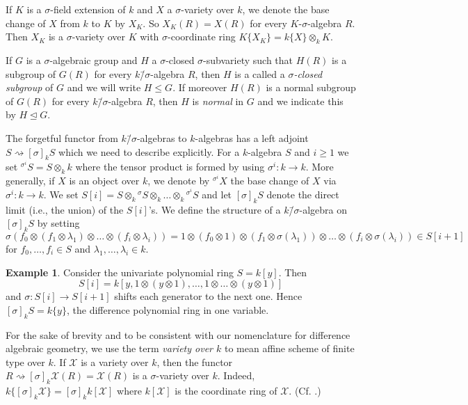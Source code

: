 \documentclass[oneside,reqno]{amsart}
\theoremstyle{definition}
\newtheorem{ex}[theo]{Example}
\newcommand{\X}{\mathcal{X}}
\newcommand{\s}{\sigma}
\newcommand{\hs}{{{}^\sigma\!}}
\newcommand{\ks}{$k$\=/$\s$}
\newcommand{\hsi}{^{\sigma^i}\!}
\begin{document}
If $K$ is a $\s$-field extension of $k$ and $X$ a $\s$-variety over $k$, we denote the base change of $X$ from $k$ to $K$ by $X_K$. So $X_K(R)=X(R)$ for every $K$-$\s$-algebra $R$. Then $X_K$ is a $\s$-variety over $K$ with $\s$-coordinate ring $K\{X_K\}=k\{X\}\otimes_k K$. 

If $G$ is a $\s$-algebraic group and $H$ a $\s$-closed $\s$-subvariety such that $H(R)$ is a subgroup of $G(R)$ for every \ks-algebra $R$, then $H$ is a called a \emph{$\s$-closed subgroup} of $G$ and we will write $H\leq G$. If moreover $H(R)$ is a normal subgroup of $G(R)$ for every \ks-algebra $R$, then $H$ is \emph{normal} in $G$ and we indicate this by $H\unlhd G$.  




The forgetful functor from \ks-algebras to $k$-algebras has a left adjoint $S\rightsquigarrow [\s]_k S$ which we need to describe explicitly. For a $k$-algebra $S$ and $i\geq 1$ we set ${\hsi S}=S\otimes_k k$ where the tensor product is formed by using $\s^i\colon k\to k$. More generally, if $X$ is an object over $k$, we denote by ${\hsi X}$ the base change of $X$ via $\s^i\colon k\to k$. We set $S[i]=S\otimes_k{\hs S}\otimes_k\ldots\otimes_k {\hsi S}$ and 
let $[\s]_k S$ denote the direct limit (i.e., the union) of the $S[i]$'s. We define the structure of a \ks-algebra on $[\s]_k S$ by setting 
$$\s(f_0\otimes(f_1\otimes\lambda_1)\otimes\ldots\otimes(f_i\otimes\lambda_i))=1\otimes (f_0\otimes 1)\otimes(f_1\otimes\s(\lambda_1))\otimes\ldots\otimes (f_i\otimes\s(\lambda_i))\in S[i+1]$$
for $f_0,\ldots,f_i\in S$ and $\lambda_1,\ldots,\lambda_i\in k$.


\begin{ex}
Consider the univariate polynomial ring $S=k[y]$. Then $$S[i]=k[y, 1\otimes(y\otimes 1), \dots, 1\otimes \dots \otimes (y\otimes 1)]$$ and $\s\colon S[i]\to S[i+1]$ shifts each generator to the next one. Hence $[\s]_kS=k\{y\}$, the difference polynomial ring in one variable.
\end{ex}


For the sake of brevity and to be consistent with our nomenclature for difference algebraic geometry, we use the term \emph{variety over $k$} to mean affine scheme of finite type over $k$.
If $\X$ is a variety over $k$, then the functor $R\rightsquigarrow[\s]_k\X(R)=\X(R)$ is a $\s$-variety over $k$. Indeed, $k\{[\s]_k\X\}=[\s]_k k[\X]$ where $k[\X]$ is the coordinate ring of $\X$. (Cf. \cite[Section 1.3]{Wibmer:FinitenessPropertiesOfAffineDifferenceAlgebraicGroups}.)
\end{document}
